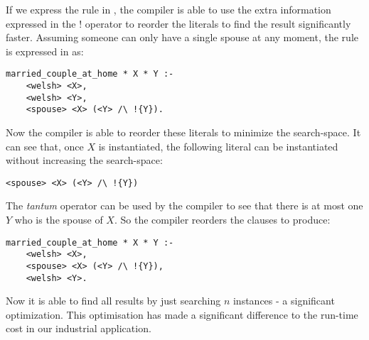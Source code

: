 If we express the rule in \ELFULL{}, the compiler is able to use the extra information expressed in the $!$ operator to reorder the literals to find the result significantly faster.
Assuming someone can only have a single spouse at any moment, the rule is expressed in \ELFULL{} as:
\begin{verbatim}
married_couple_at_home * X * Y :-
    <welsh> <X>,
    <welsh> <Y>,
    <spouse> <X> (<Y> /\ !{Y}).
\end{verbatim}	
Now the compiler is able to reorder these literals to minimize the search-space. 
It can see that, once $X$ is instantiated, the following literal can be instantiated without increasing the search-space:
\begin{verbatim}
<spouse> <X> (<Y> /\ !{Y})
\end{verbatim}
The \emph{tantum} operator can be used by the compiler to see that there is at most one $Y$ who is the spouse of $X$.
So the compiler reorders the clauses to produce:
\begin{verbatim}
married_couple_at_home * X * Y :-
    <welsh> <X>,
    <spouse> <X> (<Y> /\ !{Y}),
    <welsh> <Y>.
\end{verbatim}	
Now it is able to find all results by just searching $n$ instances - a significant optimization.
This optimisation has made a significant difference to the run-time cost in our industrial application.






